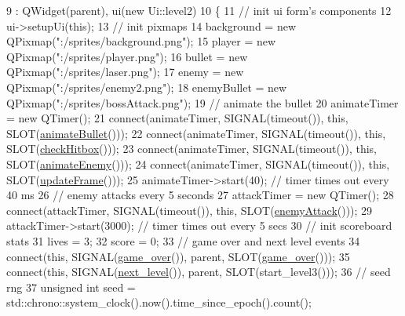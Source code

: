 \begin{DoxyCode}
9                               : QWidget(parent), ui(\textcolor{keyword}{new} Ui::level2)
10 \{
11     \textcolor{comment}{// init ui form's components}
12     ui->setupUi(\textcolor{keyword}{this});
13     \textcolor{comment}{// init pixmaps}
14     background = \textcolor{keyword}{new} QPixmap(\textcolor{stringliteral}{":/sprites/background.png"});
15     player = \textcolor{keyword}{new} QPixmap(\textcolor{stringliteral}{":/sprites/player.png"});
16     bullet = \textcolor{keyword}{new} QPixmap(\textcolor{stringliteral}{":/sprites/laser.png"});
17     enemy = \textcolor{keyword}{new} QPixmap(\textcolor{stringliteral}{":/sprites/enemy2.png"});
18     enemyBullet = \textcolor{keyword}{new} QPixmap(\textcolor{stringliteral}{":/sprites/bossAttack.png"});
19     \textcolor{comment}{// animate the bullet}
20     animateTimer = \textcolor{keyword}{new} QTimer();
21     connect(animateTimer, SIGNAL(timeout()), \textcolor{keyword}{this}, SLOT(\hyperlink{classlevel2_ae16aee7a8edd8fe1c52ff9e9a7b88017}{animateBullet}()));
22     connect(animateTimer, SIGNAL(timeout()), \textcolor{keyword}{this}, SLOT(\hyperlink{classlevel2_a636ce0136ade6b52f93d6addcb5a4274}{checkHitbox}()));
23     connect(animateTimer, SIGNAL(timeout()), \textcolor{keyword}{this}, SLOT(\hyperlink{classlevel2_a8ac4c147da9cf53e5da58f265b8ae27c}{animateEnemy}()));
24     connect(animateTimer, SIGNAL(timeout()), \textcolor{keyword}{this}, SLOT(\hyperlink{classlevel2_a4a0d1f53743f3e6d703dc964889b9fb1}{updateFrame}()));
25     animateTimer->start(40); \textcolor{comment}{// timer times out every 40 ms}
26     \textcolor{comment}{// enemy attacks every 5 seconds}
27     attackTimer = \textcolor{keyword}{new} QTimer();
28     connect(attackTimer, SIGNAL(timeout()), \textcolor{keyword}{this}, SLOT(\hyperlink{classlevel2_a751ea7e83ef9372f79e0fedc77ce5088}{enemyAttack}()));
29     attackTimer->start(3000); \textcolor{comment}{// timer times out every 5 secs}
30     \textcolor{comment}{// init scoreboard stats}
31     lives = 3;
32     score = 0;
33     \textcolor{comment}{// game over and next level events}
34     connect(\textcolor{keyword}{this}, SIGNAL(\hyperlink{classlevel2_a688ffd62097bfe0e62e16c34f4b0c0fb}{game\_over}()), parent, SLOT(\hyperlink{classlevel2_a688ffd62097bfe0e62e16c34f4b0c0fb}{game\_over}()));
35     connect(\textcolor{keyword}{this}, SIGNAL(\hyperlink{classlevel2_ab9639c124108ea3170de5051f9016151}{next\_level}()), parent, SLOT(start\_level3()));
36     \textcolor{comment}{// seed rng}
37     \textcolor{keywordtype}{unsigned} \textcolor{keywordtype}{int} seed = std::chrono::system\_clock().now().time\_since\_epoch().count();

\end{DoxyCode}
